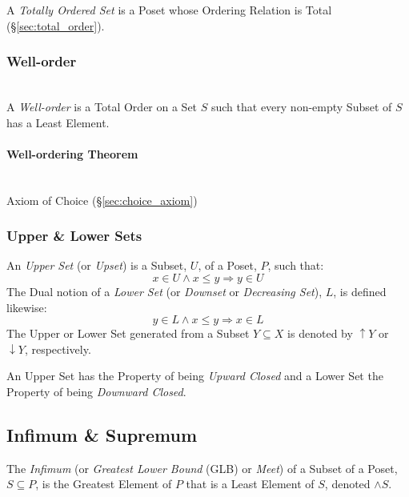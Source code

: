 A \emph{Totally Ordered Set} is a Poset whose Ordering Relation is
Total (\S\ref{sec:total_order}).



\subsubsection{Well-order}\label{sec:well_order} \hfill \\

A \emph{Well-order} is a Total Order on a Set $S$ such that every
non-empty Subset of $S$ has a Least Element.

\paragraph{Well-ordering Theorem}\label{sec:wellorder_theorem}
\hfill \\

Axiom of Choice (\S\ref{sec:choice_axiom})



\subsubsection{Upper \& Lower Sets}\label{sec:upper_lower}

An \emph{Upper Set} (or \emph{Upset}) is a Subset, $U$, of a Poset,
$P$, such that:
\[
  x \in U \wedge x \leq y \Rightarrow y \in U
\]
The Dual notion of a \emph{Lower Set} (or \emph{Downset} or
\emph{Decreasing Set}), $L$, is defined likewise:
\[
  y \in L \wedge x \leq y \Rightarrow x \in L
\]
The Upper or Lower Set generated from a Subset $Y \subseteq X$ is
denoted by $\uparrow Y$ or $\downarrow Y$, respectively.

An Upper Set has the Property of being \emph{Upward Closed} and a
Lower Set the Property of being \emph{Downward Closed}.



\subsection{Infimum \& Supremum}\label{sec:glb_lub}

The \emph{Infimum} (or \emph{Greatest Lower Bound} (GLB) or
\emph{Meet}) of a Subset of a Poset, $S \subseteq P$, is the Greatest
Element of $P$ that is a Least Element of $S$, denoted $\wedge S$.

